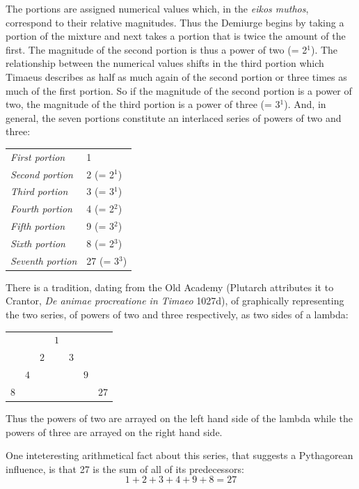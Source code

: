 The portions are assigned numerical values which, in the \emph{eikos muthos}, correspond to their relative magnitudes. Thus the Demiurge begins by taking a portion of the mixture and next takes a portion that is twice the amount of the first. The magnitude of the second portion is thus a power of two (= 2\( ^1 \)). The relationship between the numerical values shifts in the third portion which Timaeus describes as half as much again of the second portion or three times as much of the first portion. So if the magnitude of the second portion is a power of two, the magnitude of the third portion is a power of three (= 3\( ^1 \)). And, in general, the seven portions constitute an interlaced series of powers of two and three:
\begin{center}
	\begin{tabular}{l l}
		\emph{First portion} & 1\\
		\emph{Second portion} & 2 (= 2\( ^1 \))\\
		\emph{Third portion} & 3 (= 3\( ^1 \))\\
		\emph{Fourth portion} & 4 (= 2\( ^2 \))\\
		\emph{Fifth portion} & 9 (= 3\( ^2 \))\\
		\emph{Sixth portion} & 8 (= 2\( ^3 \))\\
		\emph{Seventh portion} & 27 (= 3\( ^3 \))\\
	\end{tabular}
\end{center}
There is a tradition, dating from the Old Academy (Plutarch attributes it to Crantor, \emph{De animae procreatione in Timaeo} 1027d), of graphically representing the two series, of powers of two and three respectively, as two sides of a lambda:
\begin{center}
	\begin{tabular}{c c c c c c c}
		 & & & \( 1 \) & & &\\
		 & & \( 2 \) & & \( 3 \) &\\
		 & \( 4 \) & & & & \( 9 \)\\
		 \( 8 \) & & & & & & \( 27 \)
	\end{tabular}
\end{center}
Thus the powers of two are arrayed on the left hand side of the lambda while the powers of three are arrayed on the right hand side. 

One inteteresting arithmetical fact about this series, that suggests a Pythagorean influence, is that 27 is the sum of all of its predecessors:
\[
	1 + 2 + 3 + 4 + 9 + 8 = 27
\]

